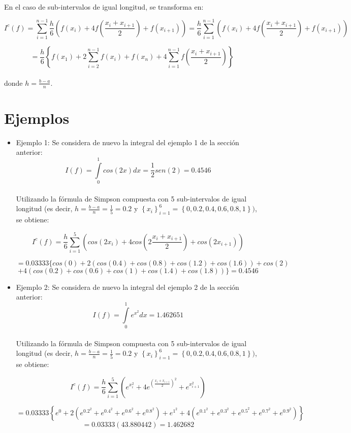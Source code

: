 \documentclass[report,oneside]{revcoles}
\begin{document}
~\\En el caso de sub-intervalos de igual longitud, se transforma en:

$$I^{c}(f)=\sum\limits_{i=1}^{n-1}\frac{h}{6}\left(f(x_{i})+4f\left(\frac{x_{i}+x_{i+1}}{2}\right)+f(x_{i+1})\right)=\frac{h}{6}\sum\limits_{i=1}^{n-1}\left(f(x_{i})+4f\left(\frac{x_{i}+x_{i+1}}{2}\right)+f(x_{i+1})\right)$$

$$=\frac{h}{6}\left\lbrace f(x_{1})+2\sum\limits_{i=2}^{n-1}f(x_{i})+f(x_{n})+4\sum\limits_{i=1}^{n-1}f\left(\frac{x_{i}+x_{i+1}}{2}\right)\right\rbrace$$
~\\donde $h=\frac{b-a}{n}$.
\section{Ejemplos}
\begin{itemize}
\item[]Ejemplo 1: Se considera de nuevo la integral del ejemplo 1 de la sección anterior:
$$I(f)=\int\limits_{0}^{1}cos(2x)dx=\frac{1}{2}sen(2)=0.4546$$
~\\Utilizando la fórmula de Simpson compuesta con 5 sub-intervalos de igual longitud (es decir, $h=\frac{b-a}{n}=\frac{1}{5}=0.2$ y $\left\lbrace x_{i} \right\rbrace ^{6}_{i=1}=\left\lbrace 0,0.2,0.4,0.6,0.8,1 \right\rbrace )$, se obtiene:

$$I^{c}(f)=\frac{h}{6}\sum\limits_{i=1}^{5} \left( cos(2x_{i})+4cos \left( 2\frac{x_{i}+x_{i+1}}{2} \right)+cos(2x_{i+1}) \right)$$

$$=0.03333\{ cos(0)+2(cos(0.4)+cos(0.8)+cos(1.2)+cos(1.6))+cos(2)$$
$$+4(cos(0.2)+cos(0.6)+cos(1)+cos(1.4)+cos(1.8))\}=0.4546$$

\item[]Ejemplo 2: Se considera de nuevo la integral del ejemplo 2 de la sección anterior:
$$I(f)=\int\limits_{0}^{1}e^{x^2}dx=1.462651$$ 
~\\Utilizando la fórmula de Simpson compuesta con 5 sub-intervalos de igual longitud (es decir, $h=\frac{b-a}{n}=\frac{1}{5}=0.2$ y $\left\lbrace x_{i} \right\rbrace ^{6}_{i=1}=\left\lbrace 0,0.2,0.4,0.6,0.8,1 \right\rbrace )$, se obtiene:

$$I^{c}(f)=\frac{h}{6}\sum\limits_{i=1}^{5} \left( e^{x^{2}_{i}}+4 e^{\left(\frac{x_{i}+x_{i+1}}{2} \right)^2}+e^{x_{i+1}^2} \right)$$

$$=0.03333\left\lbrace e^{0}+2(e^{0.2^2}+e^{0.4^2}+e^{0.6^2}+e^{0.8^2})+e^{1^2}+4(e^{0.1^2}+e^{0.3^2}+e^{0.5^2}+e^{0.7^2}+e^{0.9^2})\right\rbrace$$
$$=0.03333(43.880442)=1.462682$$


\end{itemize}
\end{document}
